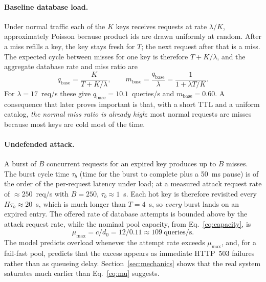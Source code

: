 \documentclass[preprint,12pt]{elsarticle}
\begin{document}
\paragraph{Baseline database load.} Under normal traffic each of the $K$ keys receives
requests at rate $\lambda/K$, approximately Poisson because product ids are drawn
uniformly at random. After a miss refills a key, the key stays fresh for $T$; the next
request after that is a miss. The expected cycle between misses for one key is
therefore $T + K/\lambda$, and the aggregate database rate and miss ratio are
\begin{equation}
q_{\mathrm{base}} = \frac{K}{T + K/\lambda}, \qquad
m_{\mathrm{base}} = \frac{q_{\mathrm{base}}}{\lambda} = \frac{1}{1+\lambda T/K}.
\label{eq:baseline}
\end{equation}
For $\lambda=17$~req/s these give $q_{\mathrm{base}}=10.1$~queries/s and
$m_{\mathrm{base}}=0.60$. A consequence that later proves important is that, with a
short TTL and a uniform catalog, \emph{the normal miss ratio is already high}: most
normal requests are misses because most keys are cold most of the time.

\paragraph{Undefended attack.} A burst of $B$ concurrent requests for an expired key
produces up to $B$ misses. The burst cycle time $\tau_b$ (time for the burst to
complete plus a 50~ms pause) is of the order of the per-request latency under load; at
a measured attack request rate of ${\approx}250$~req/s with $B=250$, $\tau_b\approx1$~s.
Each hot key is therefore revisited every $H\tau_b\approx20$~s, which is much longer
than $T=4$~s, so \emph{every} burst lands on an expired entry. The offered rate of
database attempts is bounded above by the attack request rate, while the nominal pool
capacity, from Eq.~\eqref{eq:capacity}, is
\begin{equation}
\mu_{\max} = c/d_0 = 12/0.11 \approx 109~\text{queries/s}.
\label{eq:mu}
\end{equation}
The model predicts overload whenever the attempt rate exceeds $\mu_{\max}$, and, for a
fail-fast pool, predicts that the excess appears as immediate HTTP~503 failures rather
than as queueing delay. Section~\ref{sec:mechanics} shows that the real system
saturates much earlier than Eq.~\eqref{eq:mu} suggests.
\end{document}
